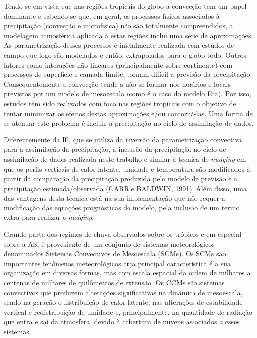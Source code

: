 Tendo-se em vista que nas regiões tropicais do globo a convecção tem um papel dominante e sabendo-se que, em geral, os processos físicos associados à precipitação (convecção e microfisica) não são totalmente compreendidos, a modelagem atmosférica aplicada à estas regiões inclui uma série de aproximações. As parametrização desses processos é inicialmente realizada com estudos de campo que logo são modelados e então, extrapolados para o globo todo. Outros fatores como interações não lineares (principalmente sobre continente) com processos de superfície e camada limite, tornam difícil a previsão da precipitação. Consequentemente a convecção tende a não se formar nos horários e locais previstos por um modelo de mesoescala (como é o caso do modelo Eta). Por isso, estudos têm sido realizados com foco nas regiões tropicais com o objetivo de tentar minimizar os efeitos destas aproximações e/ou contorná-las. Uma forma de se atenuar este problema é incluir a precipitação no ciclo de assimilação de dados.

Diferentemente da IF, que se utiliza da inversão da parametrização convectiva para a assimilação da precipitação, a inclusão da precipitação no ciclo de assimilação de dados realizada neste trabalho é similar à técnica de \textit{nudging} em que os perfis verticais de calor latente, umidade e temperatura são modificados à partir da comparação da precipitação produzida pelo modelo de previsão e a precipitação estimada/observada (CARR e BALDWIN, 1991). Além disso, uma das vantagens desta técnica está na sua implementação que não requer a modificação das equações prognósticas do modelo, pela inclusão de um termo extra para realizar o \textit{nudging}.

Grande parte dos regimes de chuva observados sobre os trópicos e em especial sobre a AS, é proveniente de um conjunto de sistemas meteorológicos denominados Sistemas Convectivos de Mesoescala (SCMs). Os SCMs são importantes fenômenos meteorológicos  cuja principal característica é a sua organização em diversas formas, mas com escala espacial da ordem de milhares a centenas de milhares de quilômetros de extensão. Os CCMs são sistemas convectivos que produzem alterações significativas na dinâmica de mesoescala, sendo na geração e distribuição de calor latente, nas alterações de estabilidade vertical e redistribuição de umidade e, principalmente, na quantidade de radiação que entra e sai da atmosfera, devido à cobertura de nuvens associados a esses sistemas.

